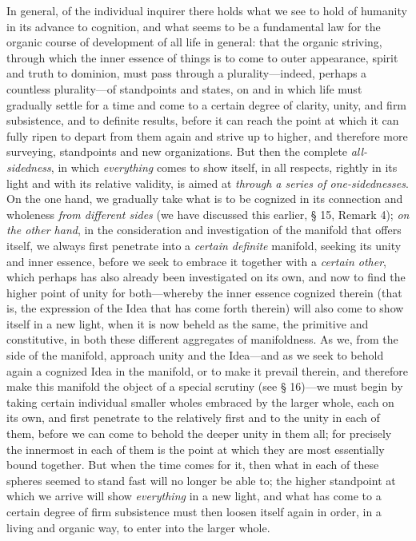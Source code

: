 \documentclass[12pt,a4paper]{book}
\begin{document}
In general, of the individual
inquirer there holds what we see to hold of humanity in its advance to cognition, and what seems to
be a fundamental law for the organic course of development of all life in general: that the organic
striving, through which the inner essence of things is to come to outer appearance, spirit and truth
to dominion, must pass through a plurality---indeed, perhaps a countless plurality---of standpoints
and states, on and in which life must gradually settle for a time and come to a certain degree of
clarity, unity, and firm subsistence, and to definite results, before it can reach the point at
which it can fully ripen to depart from them again and strive up to higher, and therefore more
surveying, standpoints and new organizations. But then the complete \emph{all-sidedness}, in which
\emph{everything} comes to show itself, in all respects, rightly in its light and with its relative
validity, is aimed at \emph{through a series of one-sidednesses}. On the one hand, we gradually take
what is to be cognized in its connection and wholeness \emph{from different sides} (we have discussed
this earlier, § 15, Remark 4); \emph{on the other hand}, in the consideration and investigation of the
manifold that offers itself, we always first penetrate into a \emph{certain definite} manifold,
seeking its unity and inner essence, before we seek to embrace it together with a \emph{certain
other}, which perhaps has also already been investigated on its own, and now to find the higher point
of unity for both---whereby the inner essence cognized therein (that is, the expression of the Idea
that has come forth therein) will also come to show itself in a new light, when it is now beheld as
the same, the primitive and constitutive, in both these different aggregates of manifoldness. As we,
from the side of the manifold, approach unity and the Idea---and as we seek to behold again a
cognized Idea in the manifold, or to make it prevail therein, and therefore make this manifold the
object of a special scrutiny (see § 16)---we must begin by taking certain individual smaller wholes
embraced by the larger whole, each on its own, and first penetrate to the relatively first and to the
unity in each of them, before we can come to behold the deeper unity in them all; for precisely the
innermost in each of them is the point at which they are most essentially bound together. But when
the time comes for it, then what in each of these spheres seemed to stand fast will no longer be able
to; the higher standpoint at which we arrive will show \emph{everything} in a new light, and what has
come to a certain degree of firm subsistence must then loosen itself again in order, in a living and
organic way, to enter into the larger whole.
\end{document}
